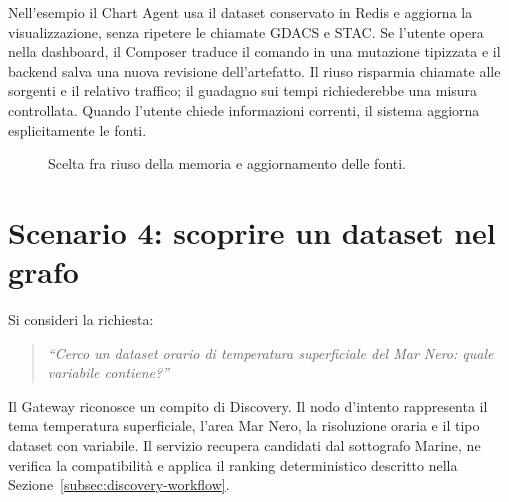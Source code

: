 Nell'esempio il Chart Agent usa il dataset conservato in Redis e aggiorna la
visualizzazione, senza ripetere le chiamate GDACS e STAC. Se l'utente opera
nella dashboard, il Composer traduce il comando in una mutazione tipizzata e
il backend salva una nuova revisione dell'artefatto. Il riuso risparmia
chiamate alle sorgenti e il relativo traffico; il guadagno sui tempi
richiederebbe una misura controllata. Quando l'utente chiede informazioni
correnti, il sistema aggiorna esplicitamente le fonti.

\begin{figure}[htbp]
\centering
{}
\caption{Scelta fra riuso della memoria e aggiornamento delle fonti.}
\label{fig:follow-up}
\end{figure}

\section{Scenario 4: scoprire un dataset nel grafo}
\label{sec:scenario-discovery}

Si consideri la richiesta:

\begin{quote}
\emph{``Cerco un dataset orario di temperatura superficiale del Mar Nero:
quale variabile contiene?''}
\end{quote}

Il Gateway riconosce un compito di Discovery. Il nodo d'intento rappresenta il
tema temperatura superficiale, l'area Mar Nero, la risoluzione oraria e il
tipo dataset con variabile. Il servizio recupera candidati dal sottografo
Marine, ne verifica la compatibilità e applica il ranking deterministico
descritto nella Sezione~\ref{subsec:discovery-workflow}.

